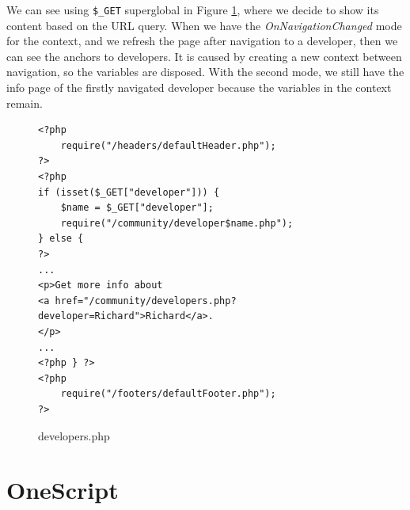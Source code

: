\par
We can see using \texttt{\$\_GET} superglobal in Figure \ref{img25:developer}, where we decide to show its content based on the URL query.
When we have the \textit{OnNavigationChanged} mode for the context, and we refresh the page after navigation to a developer, then we can see the anchors to developers.
It is caused by creating a new context between navigation, so the variables are disposed.
With the second mode, we still have the info page of the firstly navigated developer because the variables in the context remain.
\par
\begin{figure}[H]
\begin{lstlisting}
<?php
    require("/headers/defaultHeader.php");
?>
<?php
if (isset($_GET["developer"])) { 
    $name = $_GET["developer"];
    require("/community/developer$name.php");
} else {
?>
...
<p>Get more info about 
<a href="/community/developers.php?developer=Richard">Richard</a>.
</p>
...
<?php } ?>
<?php
    require("/footers/defaultFooter.php");
?>
\end{lstlisting}
\caption{developers.php}
\label{img25:developer}
\end{figure}

\section{OneScript}

